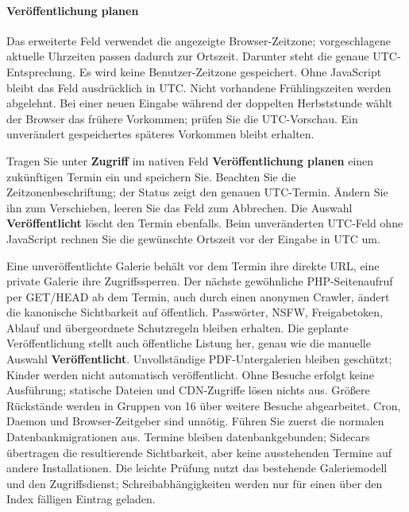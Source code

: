 \documentclass[11pt,a4paper]{article}
\newcommand{\ui}[1]{\textbf{#1}}
\begin{document}
\paragraph{Veröffentlichung planen}
Das erweiterte Feld verwendet die angezeigte Browser-Zeitzone; vorgeschlagene
aktuelle Uhrzeiten passen dadurch zur Ortszeit. Darunter steht die genaue
UTC-Entsprechung. Es wird keine Benutzer-Zeitzone gespeichert. Ohne JavaScript
bleibt das Feld ausdrücklich in UTC. Nicht vorhandene Frühlingszeiten werden
abgelehnt. Bei einer neuen Eingabe während der doppelten Herbststunde wählt
der Browser das frühere Vorkommen; prüfen Sie die UTC-Vorschau.
Ein unverändert gespeichertes späteres Vorkommen bleibt erhalten.

Tragen Sie unter \ui{Zugriff} im nativen Feld
\ui{Veröffentlichung planen} einen zukünftigen Termin ein und speichern Sie.
Beachten Sie die Zeitzonenbeschriftung; der Status zeigt den genauen
UTC-Termin. Ändern Sie ihn zum Verschieben, leeren Sie das Feld zum Abbrechen.
Die Auswahl \ui{Veröffentlicht} löscht den Termin ebenfalls.
Beim unveränderten UTC-Feld ohne JavaScript rechnen Sie die gewünschte
Ortszeit vor der Eingabe in UTC um.

Eine unveröffentlichte Galerie behält vor dem Termin ihre direkte URL,
eine private Galerie ihre Zugriffssperren. Der nächste gewöhnliche
PHP-Seitenaufruf per GET/HEAD ab dem Termin, auch durch einen anonymen
Crawler, ändert die kanonische Sichtbarkeit auf öffentlich.
Passwörter, NSFW, Freigabetoken, Ablauf und übergeordnete Schutzregeln bleiben
erhalten. Die geplante Veröffentlichung stellt auch öffentliche Listung her,
genau wie die manuelle Auswahl \ui{Veröffentlicht}.
Unvollständige PDF-Untergalerien bleiben geschützt; Kinder werden nicht
automatisch veröffentlicht. Ohne Besuche erfolgt keine Ausführung;
statische Dateien und CDN-Zugriffe lösen nichts aus. Größere Rückstände
werden in Gruppen von 16 über weitere Besuche abgearbeitet.
Cron, Daemon und Browser-Zeitgeber sind unnötig.
Führen Sie zuerst die normalen Datenbankmigrationen aus. Termine bleiben
datenbankgebunden; Sidecars übertragen die resultierende Sichtbarkeit,
aber keine ausstehenden Termine auf andere Installationen.
Die leichte Prüfung nutzt das bestehende Galeriemodell und den Zugriffsdienst;
Schreibabhängigkeiten werden nur für einen über den Index fälligen Eintrag
geladen.

\end{document}
